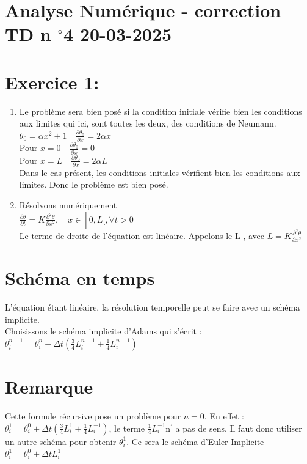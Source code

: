 \documentclass[10pt]{article}
\begin{document}
\section*{Analyse Numérique - correction TD n \({ }^{\boldsymbol{\circ}} \mathbf{4}\) 20-03-2025}
\section*{Exercice 1:}
\begin{enumerate}
  \item Le problème sera bien posé si la condition initiale vérifie bien les conditions aux limites qui ici, sont toutes les deux, des conditions de Neumann.\\
\(\theta_{0}=\alpha x^{2}+1 \quad \frac{\partial \theta_{0}}{\partial x}=2 \alpha x\)\\
Pour \(x=0 \quad \frac{\partial \theta_{0}}{\partial x}=0\)\\
Pour \(x=L \quad \frac{\partial \theta_{0}}{\partial x}=2 \alpha L\)\\
Dans le cas présent, les conditions initiales vérifient bien les conditions aux limites. Donc le problème est bien posé.
  \item Résolvons numériquement\\
\(\left.\frac{\partial \theta}{\partial t}=K \frac{\partial^{2} \theta}{\partial x^{2}}, \quad x \in\right] 0, L[, \forall t>0\)\\
Le terme de droite de l'équation est linéaire. Appelons le L , avec \(L=K \frac{\partial^{2} \theta}{\partial x^{2}}\)
\end{enumerate}

\section*{Schéma en temps}
L'équation étant linéaire, la résolution temporelle peut se faire avec un schéma implicite.\\
Choisissons le schéma implicite d'Adams qui s'écrit :\\
\(\theta_{i}^{n+1}=\theta_{i}^{n}+\Delta t\left(\frac{3}{4} L_{i}^{n+1}+\frac{1}{4} L_{i}^{n-1}\right)\)

\section*{Remarque}
Cette formule récursive pose un problème pour \(n=0\). En effet :\\
\(\theta_{i}^{1}=\theta_{i}^{0}+\Delta t\left(\frac{3}{4} L_{i}^{1}+\frac{1}{4} L_{i}^{-1}\right)\), le terme \(\frac{1}{4} L_{i}^{-1} \mathrm{n}^{\prime}\) a pas de sens. Il faut donc utiliser un autre schéma pour obtenir \(\theta_{i}^{1}\). Ce sera le schéma d'Euler Implicite \(\theta_{i}^{1}=\theta_{i}^{0}+\Delta t L_{i}^{1}\)
\end{document}
